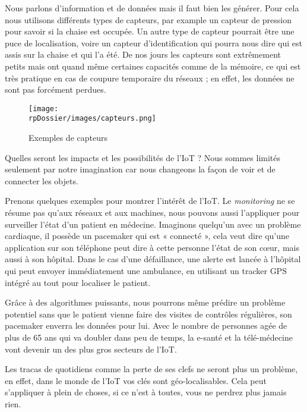 Nous parlons d'information et de données mais il faut bien les générer. Pour cela nous utilisons différents types de capteurs, par example un capteur de pression pour savoir si la chaise est occupée. Un autre type de capteur pourrait être une puce de localisation, voire un capteur d'identification qui pourra nous dire qui est assis sur la chaise et qui l'a été. De nos jours les capteurs sont extrêmement petits mais ont quand même certaines capacités comme de la mémoire, ce qui est très pratique en cas de coupure temporaire du réseaux ; en effet, les données ne sont pas forcément perdues.

\begin{figure}[H]
\centering
\texttt{[image: \\rpDossier/images/capteurs.png]}
\caption{Exemples de capteurs}
\label{sensors}
\end{figure}

Quelles seront les impacts et les possibilités de l'IoT ? Nous sommes limités seulement par notre imagination car nous changeons la façon de voir et de connecter les objets.


Prenons quelques exemples pour montrer l'intérêt de l'IoT. Le \textit{monitoring} ne se résume pas qu’aux réseaux et aux machines, nous pouvons aussi l'appliquer pour surveiller l'état d'un patient en médecine. Imaginons quelqu'un avec un problème cardiaque, il possède un pacemaker qui est « connecté », cela veut dire qu'une application sur son téléphone peut dire à cette personne l'état de son cœur, mais aussi à son hôpital. Dans le cas d'une défaillance, une alerte est lancée à l'hôpital qui peut envoyer immédiatement une ambulance, en utilisant un tracker GPS intégré au tout pour localiser le patient.

Grâce à des algorithmes puissants, nous pourrons même prédire un problème potentiel sans que le patient vienne faire des visites de contrôles régulières, son pacemaker enverra les données pour lui. Avec le nombre de personnes agée de plus de 65 ans qui va doubler dans peu de temps, la e-santé et la télé-médecine vont devenir un des plus gros secteurs de l'IoT. 


Les tracas de quotidiens comme la perte de ses clefs ne seront plus un problème, en effet, dans le monde de l'IoT vos clés sont géo-localisables. Cela peut s'appliquer à plein de choses, si ce n'est à toutes, vous ne perdrez plus jamais rien.


